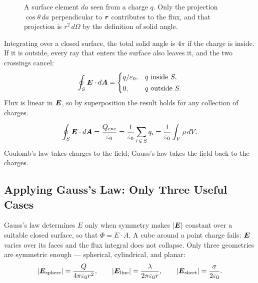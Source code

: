\begin{figure}[H]
\centering
{}
\caption{A surface element $da$ seen from a charge $q$. Only the projection $\cos\theta\,da$ perpendicular to $\bm{r}$ contributes to the flux, and that projection is $r^2\,d\Omega$ by the definition of solid angle.}
\label{fig:em-solidangle}
\end{figure}

Integrating over a closed surface, the total solid angle is $4\pi$ if the charge is inside. If it is outside, every ray that enters the surface also leaves it, and the two crossings cancel:
\[
    \oint_S \vect{E}\cdot d\vect{A} = \begin{cases} q/\varepsilon_0, & q \text{ inside } S,\\[2pt] 0, & q \text{ outside } S.\end{cases}
\]
Flux is linear in $\vect{E}$, so by superposition the result holds for any collection of charges.

\begin{fact}
\[
    \oint_S \vect{E}\cdot d\vect{A} = \frac{Q_\text{enc}}{\varepsilon_0}
    = \frac{1}{\varepsilon_0}\sum_{i\,\in\,S} q_i
    = \frac{1}{\varepsilon_0}\int_V \rho\,dV.
\]
Coulomb's law takes charges to the field; Gauss's law takes the field back to the charges.
\end{fact}

\subsection{Applying Gauss's Law: Only Three Useful Cases}

Gauss's law determines $E$ only when symmetry makes $|\vect{E}|$ constant over a suitable closed surface, so that $\Phi = E\cdot A$. A cube around a point charge fails: $\vect{E}$ varies over its faces and the flux integral does not collapse. Only three geometries are symmetric enough --- spherical, cylindrical, and planar:
\[
    |\vect{E}_\text{sphere}| = \frac{Q}{4\pi\varepsilon_0 r^2}, \qquad
    |\vect{E}_\text{line}| = \frac{\lambda}{2\pi\varepsilon_0 r}, \qquad
    |\vect{E}_\text{sheet}| = \frac{\sigma}{2\varepsilon_0}.
\]

